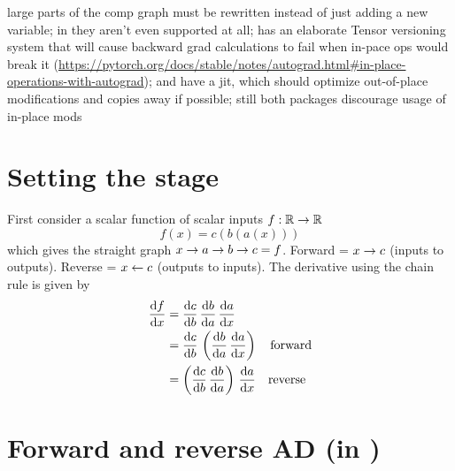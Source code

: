 \documentclass[paper=a4,11pt,headsepline]{scrartcl}
\begin{document}
\begin{itemize}
\begin{itemize}
\begin{itemize}
                large parts of the comp graph must be rewritten instead of just
                adding a new variable; in \autograd they aren't even supported
                at all;  \pytorch has an elaborate Tensor versioning system
                that will cause backward grad calculations to fail
                when in-pace ops would break it
                (\url{https://pytorch.org/docs/stable/notes/autograd.html#in-place-operations-with-autograd});
                \jax and \pytorch have a jit, which should optimize
                out-of-place modifications and copies away if possible; still
                both packages discourage usage of in-place mods
        \end{itemize}
    \end{itemize}
\end{itemize}
%
\section{Setting the stage}
%
First consider a scalar function of scalar inputs $f:\mathbb R\rightarrow\mathbb R$
\begin{equation*}
    f(x) = c(b(a(x)))
\end{equation*}
which gives the straight graph $x\rightarrow a\rightarrow b\rightarrow c = f$. Forward = $x \rightarrow c$ (inputs
to outputs). Reverse = $x \leftarrow c$ (outputs to inputs).
The derivative using the chain rule is given by
\begin{align*}
    \dfrac{\text{d} f}{\text{d} x}
        &= \dfrac{\text{d} c}{\text{d} b}\,\dfrac{\text{d} b}{\text{d} a}\,\dfrac{\text{d} a}{\text{d} x}\\
        &= \dfrac{\text{d} c}{\text{d} b}\,\left(\dfrac{\text{d} b}{\text{d} a}\,\dfrac{\text{d} a}{\text{d} x}\right)\quad\text{forward}\\
        &= \left(\dfrac{\text{d} c}{\text{d} b}\,\dfrac{\text{d} b}{\text{d} a}\right)\,\dfrac{\text{d} a}{\text{d} x}\quad\text{reverse}
\end{align*}

\section{Forward and reverse AD (in \jax)}
\end{document}
